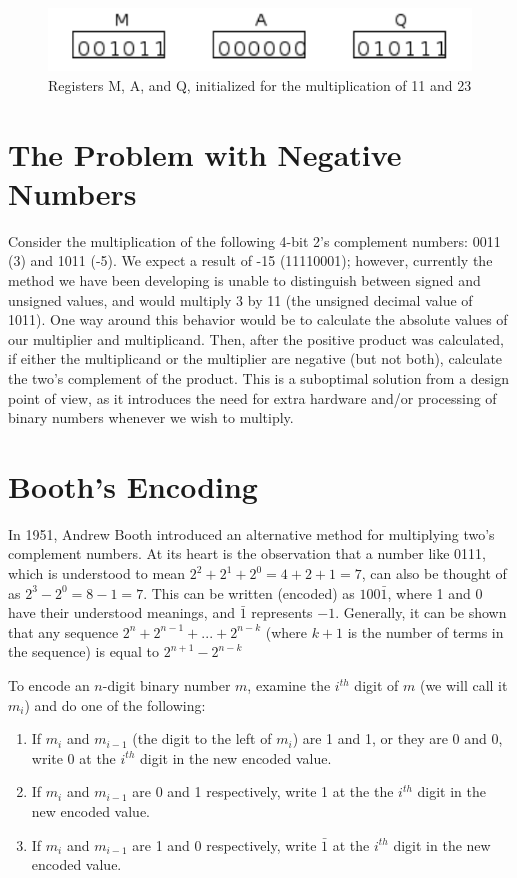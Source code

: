 \documentclass{article}
\begin{document}
\pagebreak
\begin{figure}
\centering
\includegraphics{init.pdf}
\caption{Registers M, A, and Q, initialized for the multiplication of 11 and 23}
\end{figure}

\section{The Problem with Negative Numbers}
Consider the multiplication of the following 4-bit 2's complement numbers: 0011 (3) and 1011 (-5).
We expect a result of -15 (11110001); however, currently the method we have been developing is unable to distinguish between signed and unsigned values, and would multiply 3 by 11 (the unsigned decimal value of 1011).
One way around this behavior would be to calculate the absolute values of our multiplier and multiplicand.
Then, after the positive product was calculated, if either the multiplicand or the multiplier are negative (but not both), calculate the two's complement of the product.
This is a suboptimal solution from a design point of view, as it introduces the need for extra hardware and/or processing of binary numbers whenever we wish to multiply.

\section{Booth's Encoding}
In 1951, Andrew Booth introduced an alternative method for multiplying two's complement numbers.
At its heart is the observation that a number like 0111, which is understood to mean $2^2 + 2^1 + 2^0 = 4 + 2 + 1 = 7$, can also be thought of as $2^3 - 2^0 = 8 - 1 = 7$.
This can be written (encoded) as $100\bar{1}$, where 1 and 0 have their understood meanings, and $\bar{1}$ represents $-1$.
Generally, it can be shown that any sequence $2^n + 2^{n-1} + ...
+ 2^{n-k}$ (where $k+1$ is the number of terms in the sequence) is equal to $2^{n+1} - 2^{n-k}$

To encode an $n$-digit binary number $m$, examine the $i^{th}$ digit of $m$ (we will call it $m_i$) and do one of the following: %

\begin{enumerate}
\item If $m_i$ and $m_{i-1}$ (the digit to the left of $m_i$) are 1 and 1, or they are 0 and 0, write 0 at the $i^{th}$ digit in the new encoded value.
\item If $m_i$ and $m_{i-1}$ are 0 and 1 respectively, write 1 at the the $i^{th}$ digit in the new encoded value.
\item If $m_i$ and $m_{i-1}$ are 1 and 0 respectively, write $\bar{1}$ at the $i^{th}$ digit in the new encoded value.
\end{enumerate}
\end{document}
